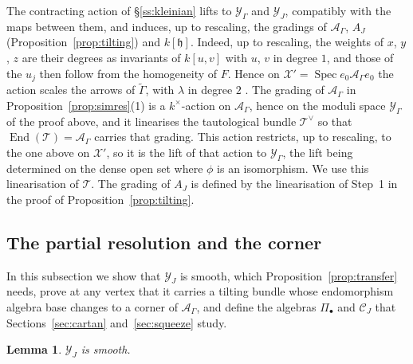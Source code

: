\documentclass[11pt]{amsart}
\makeatletter
\numberwithin{table}{section}
\numberwithin{figure}{section}
\numberwithin{equation}{section}
\newtheorem{lem}[thm]{Lemma}
\theoremstyle{definition}
\theoremstyle{plain}
\newcommand{\cC}{\mathcal{C}}
\newcommand{\cA}{\mathcal{A}}
\newcommand{\cX}{\mathcal{X}}
\newcommand{\cY}{\mathcal{Y}}
\newcommand{\h}{\mathfrak{h}}
\newcommand{\bul}{\bullet}
\newcommand{\tGamma}{\widetilde{\Gamma}}
\DeclareMathOperator{\Spec}{Spec}
\DeclareMathOperator{\End}{End}
\renewcommand\paragraph{\@startsection{paragraph}{4}{\z@}{\medskipamount}{-.5em}{\normalfont\bfseries}}
\makeatother
\begin{document}
\paragraph{Gradings.} The contracting action of \S\ref{ss:kleinian} lifts to $\cY_\Gamma$ and $\cY_J$, compatibly with the maps between them, and induces, up to rescaling, the gradings of $\cA_\Gamma$, $A_J$ (Proposition~\ref{prop:tilting}) and $k[\h]$. Indeed, up to rescaling, the weights of $x$, $y$, $z$ are their degrees as invariants of $k[u, v]$ with $u$, $v$ in degree $1$, and those of the $u_j$ then follow from the homogeneity of $F$. Hence on $\cX' = \Spec e_0\cA_\Gamma e_0$ the action scales the arrows of $\tGamma$, with $\lambda$ in degree $2$ \cite[Lemma~8.2, Cor~8.12]{CBH}. The grading of $\cA_\Gamma$ in Proposition~\ref{prop:simres}(1) is a $k^\times$-action on $\cA_\Gamma$, hence on the moduli space $\cY_\Gamma$ of the proof above, and it linearises the tautological bundle $\mathcal T^\vee$ so that $\End(\mathcal T) = \cA_\Gamma$ carries that grading. This action restricts, up to rescaling, to the one above on $\cX'$, so it is the lift of that action to $\cY_\Gamma$, the lift being determined on the dense open set where $\phi$ is an isomorphism. We use this linearisation of $\mathcal T$. The grading of $A_J$ is defined by the linearisation of Step~1 in the proof of Proposition~\ref{prop:tilting}.

\subsection{The partial resolution and the corner}\label{ss:partial}

In this subsection we show that $\cY_J$ is smooth, which Proposition~\ref{prop:transfer} needs, prove at any vertex that it carries a tilting bundle whose endomorphism algebra base changes to a corner of $\cA_\Gamma$, and define the algebras $\Pi_\bul$ and $\cC_J$ that Sections~\ref{sec:cartan} and~\ref{sec:squeeze} study.

\begin{lem}\label{lem:Ysmooth}
$\cY_J$ is smooth.
\end{lem}
\end{document}

